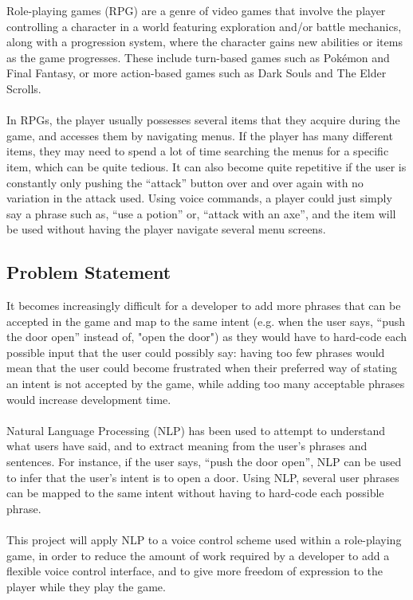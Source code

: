 \documentclass[11pt]{article}
\begin{document}
Role-playing games (RPG) are a genre of video games that involve the player controlling a character in a world featuring exploration and/or battle mechanics, along with a progression system, where the character gains new abilities or items as the game progresses. These include turn-based games such as Pok\'emon and Final Fantasy, or more action-based games such as Dark Souls and The Elder Scrolls.
\\
\\
In RPGs, the player usually possesses several items that they acquire during the game, and accesses them by navigating menus. If the player has many different items, they may need to spend a lot of time searching the menus for a specific item, which can be quite tedious. It can also become quite repetitive if the user is constantly only pushing the ``attack'' button over and over again with no variation in the attack used. Using voice commands, a player could just simply say a phrase such as, ``use a potion'' or, ``attack with an axe'', and the item will be used without having the player navigate several menu screens.

\subsection{Problem Statement}

It becomes increasingly difficult for a developer to add more phrases that can be accepted in the game and map to the same intent (e.g. when the user says, ``push the door open'' instead of, "open the door") as they would have to hard-code each possible input that the user could possibly say: having too few phrases would mean that the user could become frustrated when their preferred way of stating an intent is not accepted by the game, while adding too many acceptable phrases would increase development time.
\\
\\
Natural Language Processing (NLP) has been used to attempt to understand what users have said, and to extract meaning from the user's phrases and sentences. For instance, if the user says, ``push the door open'', NLP can be used to infer that the user's intent is to open a door. Using NLP, several user phrases can be mapped to the same intent without having to hard-code each possible phrase.
\\
\\
This project will apply NLP to a voice control scheme used within a role-playing game, in order to reduce the amount of work required by a developer to add a flexible voice control interface, and to give more freedom of expression to the player while they play the game.
\end{document}
